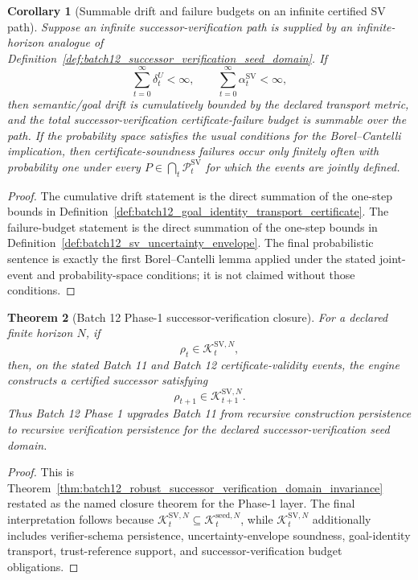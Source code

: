 \documentclass[11pt]{article}
\newtheorem{theorem}{Theorem}[section]
\newtheorem{corollary}[theorem]{Corollary}
\newcommand{\Pcal}{\mathcal{P}}
\newcommand{\1}{\mathbf{1}}
\providecommand{\Kcal}{\mathcal{K}}
\begin{document}
\begin{corollary}[Summable drift and failure budgets on an infinite certified SV path]
\label{cor:batch12_summable_drift_failure}
Suppose an infinite successor-verification path is supplied by an infinite-horizon analogue of Definition~\ref{def:batch12_successor_verification_seed_domain}.  If
\[
\sum_{t=0}^{\infty}\delta_t^U<\infty,
\qquad
\sum_{t=0}^{\infty}\alpha_t^{\mathrm{SV}}<\infty,
\]
then semantic/goal drift is cumulatively bounded by the declared transport metric, and the total successor-verification certificate-failure budget is summable over the path.  If the probability space satisfies the usual conditions for the Borel--Cantelli implication, then certificate-soundness failures occur only finitely often with probability one under every \(P\in\bigcap_t\Pcal_t^{\mathrm{SV}}\) for which the events are jointly defined.
\end{corollary}

\begin{proof}
The cumulative drift statement is the direct summation of the one-step bounds in Definition~\ref{def:batch12_goal_identity_transport_certificate}.  The failure-budget statement is the direct summation of the one-step bounds in Definition~\ref{def:batch12_sv_uncertainty_envelope}.  The final probabilistic sentence is exactly the first Borel--Cantelli lemma applied under the stated joint-event and probability-space conditions; it is not claimed without those conditions.
\end{proof}

\begin{theorem}[Batch 12 Phase-1 successor-verification closure]
\label{thm:batch12_phase1_sv_closure}
For a declared finite horizon \(N\), if
\[
\rho_t\in\Kcal_t^{\mathrm{SV},N},
\]
then, on the stated Batch 11 and Batch 12 certificate-validity events, the engine constructs a certified successor satisfying
\[
\rho_{t+1}\in\Kcal_{t+1}^{\mathrm{SV},N}.
\]
Thus Batch 12 Phase 1 upgrades Batch 11 from recursive construction persistence to recursive verification persistence for the declared successor-verification seed domain.
\end{theorem}

\begin{proof}
This is Theorem~\ref{thm:batch12_robust_successor_verification_domain_invariance} restated as the named closure theorem for the Phase-1 layer.  The final interpretation follows because \(\Kcal_t^{\mathrm{SV},N}\subseteq\Kcal_t^{\mathrm{seed},N}\), while \(\Kcal_t^{\mathrm{SV},N}\) additionally includes verifier-schema persistence, uncertainty-envelope soundness, goal-identity transport, trust-reference support, and successor-verification budget obligations.
\end{proof}
\end{document}
